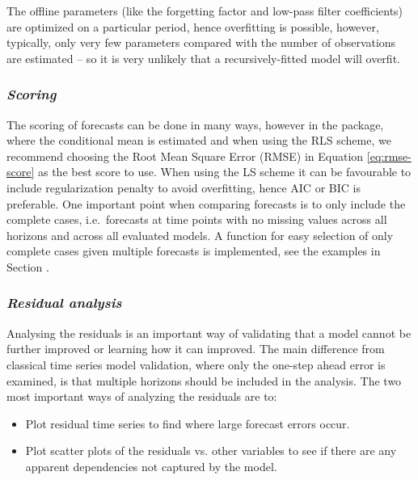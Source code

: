 The offline parameters (like the forgetting factor and low-pass filter
coefficients) are optimized on a particular period, hence overfitting is
possible, however, typically, only very few parameters compared with the number
of observations are estimated -- so it is very unlikely that a
recursively-fitted model will overfit.


\subsubsection{\it Scoring}
The scoring of forecasts can be done in many ways, however in the
\onlineforecast package,
where the conditional mean is estimated and when using the RLS scheme,
we recommend choosing the Root Mean Square Error (RMSE) in Equation
\eqref{eq:rmse-score} as the best score to use. When using the LS scheme it can
be favourable to include regularization penalty  to avoid overfitting, hence AIC or BIC
is preferable. One important point when comparing forecasts is to only include the complete
cases, i.e.\ forecasts at time points with no missing values across all horizons
and across all evaluated models. A function for easy selection of only complete
cases given multiple forecasts is implemented, see the examples in Section
.


\subsubsection{\it Residual analysis}
Analysing the residuals is an important way of validating that a model cannot be
further improved or learning how it can improved. The main difference from
classical time series model validation, where only the one-step ahead error is
examined, is that multiple horizons should be included in the analysis. The two
most important ways of analyzing the residuals are to:
\begin{itemize}
\item Plot residual time series to find where large forecast errors occur.
\item Plot scatter plots of the residuals vs. other variables to see if there
  are any apparent dependencies not captured by the model.
\end{itemize}

